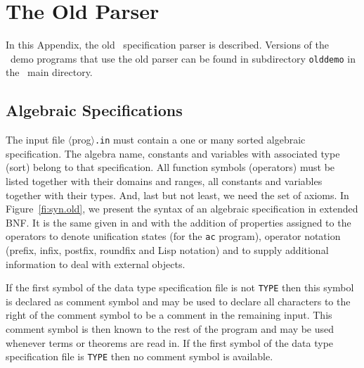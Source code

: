 \section{The Old Parser}
\label{OldParser}
In this Appendix, the old \redux\  specification parser is described. Versions
of the \redux\  demo programs that use the old parser can be found
in subdirectory {\tt olddemo} in the \redux\  main directory.

\subsection{Algebraic Specifications}
The input file  $\langle$prog$\rangle${\tt .in} must contain a one or 
many sorted algebraic specification.
The algebra name, constants and variables with associated type (sort) belong 
to that specification. All function symbols (operators) must be 
listed together with their domains and ranges, all constants and variables 
together with their types. 
And, last but not least, we need the set of axioms.
In Figure~\ref{fi:syn.old}, we present the syntax of an algebraic specification in 
extended BNF.
It is the same given in \cite{Kuechlin:82a} and 
\cite{Buendgen:87} with the addition of properties assigned to the
operators to denote unification states 
(for the {\tt ac} program),
operator notation (prefix, infix, postfix, roundfix and
Lisp notation) and to supply additional information
to deal with external objects.

If the first symbol of the data type specification file is not
{\tt TYPE} then this symbol is declared as comment symbol and may be used
to declare all characters to the right of the comment symbol to be 
a comment in the remaining input.
This comment symbol is then known to the rest of the program and
may be used whenever terms or theorems are read in.
If the first symbol of the data type specification file is {\tt TYPE} then
no comment symbol is available.



